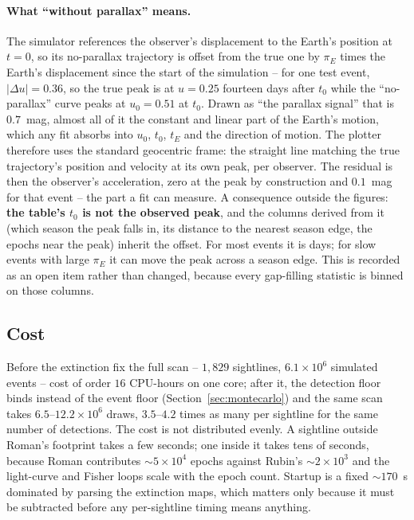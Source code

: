 \documentclass[english,10pt,a4paper]{article}
\begin{document}
	\paragraph{What ``without parallax'' means.} The simulator references the observer's displacement to the Earth's position at $t=0$, so its no-parallax trajectory is offset from the true one by $\pi_E$ times the Earth's displacement since the start of the simulation -- for one test event, $|\Delta u| = 0.36$, so the true peak is at $u=0.25$ fourteen days after $t_0$ while the ``no-parallax'' curve peaks at $u_0=0.51$ at $t_0$. Drawn as ``the parallax signal'' that is $0.7$~mag, almost all of it the constant and linear part of the Earth's motion, which any fit absorbs into $u_0$, $t_0$, $t_E$ and the direction of motion. The plotter therefore uses the standard geocentric frame: the straight line matching the true trajectory's position and velocity at its own peak, per observer. The residual is then the observer's acceleration, zero at the peak by construction and $0.1$~mag for that event -- the part a fit can measure. A consequence outside the figures: \textbf{the table's $t_0$ is not the observed peak}, and the columns derived from it (which season the peak falls in, its distance to the nearest season edge, the epochs near the peak) inherit the offset. For most events it is days; for slow events with large $\pi_E$ it can move the peak across a season edge. This is recorded as an open item rather than changed, because every gap-filling statistic is binned on those columns.

	\subsection{Cost}

	Before the extinction fix the full scan -- $1{,}829$ sightlines, $6.1\times10^{6}$ simulated events -- cost of order $16$ CPU-hours on one core; after it, the detection floor binds instead of the event floor (Section~\ref{sec:montecarlo}) and the same scan takes $6.5$--$12.2\times10^{6}$ draws, $3.5$--$4.2$ times as many per sightline for the same number of detections. The cost is not distributed evenly. A sightline outside Roman's footprint takes a few seconds; one inside it takes tens of seconds, because Roman contributes $\sim5\times10^{4}$ epochs against Rubin's $\sim2\times10^{3}$ and the light-curve and Fisher loops scale with the epoch count. Startup is a fixed $\sim170$~s dominated by parsing the extinction maps, which matters only because it must be subtracted before any per-sightline timing means anything.
\end{document}

